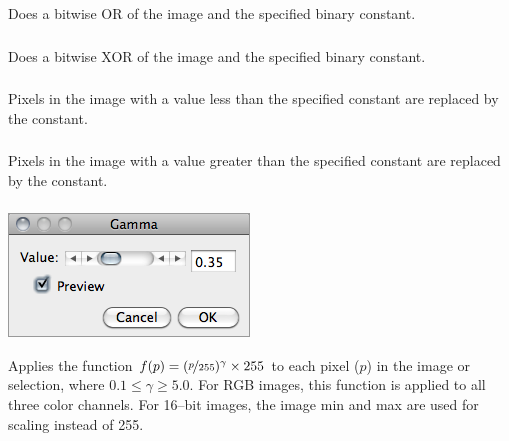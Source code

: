 Does a bitwise OR of the image and the
specified binary constant. 


\subsubsection{\protect{}}

Does a bitwise XOR of the image and the
specified binary constant. 


\subsubsection{\protect{}}

Pixels in the image with a value less than the specified constant
are replaced by the constant.


\subsubsection{\protect{}\label{sub:Max...}}

Pixels in the image with a value greater than the specified constant
are replaced by the constant.


\subsubsection{\protect{}\label{sub:Gamma...}}

\begin{minipage}[c][1\totalheight][t]{0.35\columnwidth}%
\includegraphics[scale=0.55]{images/Gamma}%
\end{minipage}%
\begin{minipage}[c][1\totalheight][t]{0.65\columnwidth}%
Applies the function $f(p)=(\nicefrac{p}{255}){}^{\gamma}\times255$
to each pixel ($p$) in the image or selection, where $0.1\leq\gamma\geq5.0$.
For RGB images, this function is applied to all three color channels.
For 16--bit images, the image min and max are used for scaling instead
of 255. 


%
\end{minipage}


